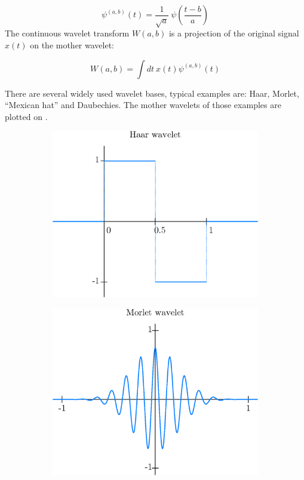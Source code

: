\begin{equation}
	\psi^{(a,b)}(t) = \frac{1}{\sqrt{a}} \: \psi\left(\frac{t-b}{a}\right)
\end{equation}
The continuous wavelet transform $W(a,b)$ is a projection of the original signal $x(t)$ on the mother wavelet:

\begin{equation}
	W(a,b) = \int \! dt \: x(t) \psi^{(a,b)}(t)
\end{equation}

There are several widely used wavelet bases, typical examples are: Haar, Morlet, ``Mexican hat'' and Daubechies.
The mother wavelets of those examples are plotted on .

\begin{figure}[h]
	\centering
	\begin{subfigure}{\minipagewidth}
		\centering
		\includegraphics[width=\textwidth]{figures/haar.eps}
		\caption{}
	\end{subfigure}
	\begin{subfigure}{\minipagewidth}
		\centering
		\includegraphics[width=\textwidth]{figures/morlet.eps}

\end{subfigure}
\end{figure}
